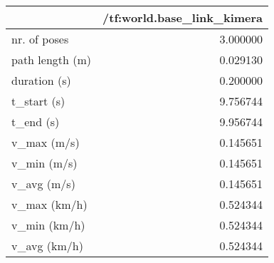 \begin{tabular}{lr}
\toprule
{} &  /tf:world.base\_link\_kimera \\
\midrule
nr. of poses    &                    3.000000 \\
path length (m) &                    0.029130 \\
duration (s)    &                    0.200000 \\
t\_start (s)     &                    9.756744 \\
t\_end (s)       &                    9.956744 \\
v\_max (m/s)     &                    0.145651 \\
v\_min (m/s)     &                    0.145651 \\
v\_avg (m/s)     &                    0.145651 \\
v\_max (km/h)    &                    0.524344 \\
v\_min (km/h)    &                    0.524344 \\
v\_avg (km/h)    &                    0.524344 \\
\bottomrule
\end{tabular}
